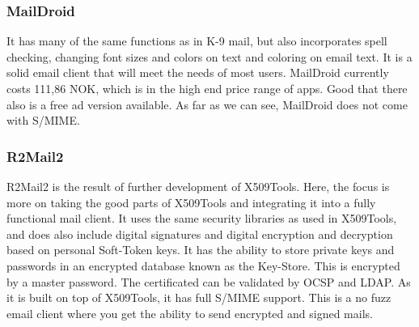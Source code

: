 \subsubsection{MailDroid}
It has many of the same functions as in K-9 mail, but also incorporates spell checking, changing font sizes and colors on text and coloring on email text. It is a solid email client that will meet the needs of most users. MailDroid currently costs 111,86 NOK, which is in the high end price range of apps. Good that there also is a free ad version available. As far as we can see, MailDroid does not come with S/MIME. 

\subsubsection{R2Mail2}
R2Mail2 is the result of further development of X509Tools. Here, the focus is more on taking the good parts of X509Tools and integrating it into a fully functional mail client. It uses the same security libraries as used in X509Tools, and does also include digital signatures and digital encryption and decryption based on personal Soft-Token keys\cite{bib:r2mail2}. It has the ability to store private keys and passwords in an encrypted database known as the Key-Store. This is encrypted by a master password. The certificated can be validated by OCSP and LDAP. As it is built on top of X509Tools, it has full S/MIME support. This is a no fuzz email client where you get the ability to send encrypted and signed mails.

